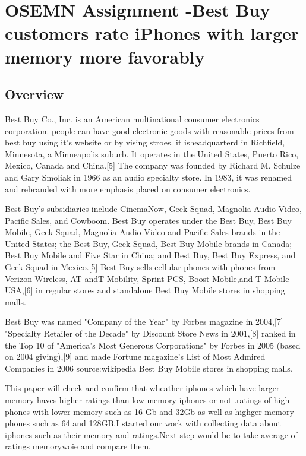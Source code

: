 \documentclass{article}\usepackage[]{graphicx}\usepackage[]{color}
\begin{document}
    \section*{OSEMN Assignment -Best Buy customers rate iPhones with larger memory more favorably}
\subsection*{Overview}
    
   \par Best Buy Co., Inc. is an American multinational consumer electronics corporation.
people can have good electronic goods with reasonable prices from best buy using it's website
or by vising stroes. it isheadquarterd in Richfield, Minnesota, a Minneapolis suburb. It operates in the United States, Puerto Rico, Mexico, Canada and China.[5] The company was founded by Richard M. Schulze and Gary Smoliak in 1966 as an audio specialty store. In 1983, it was renamed and rebranded with more emphasis placed on consumer electronics.
\smallskip
\par Best Buy's subsidiaries include CinemaNow, Geek Squad, Magnolia Audio Video, Pacific Sales, and Cowboom. Best Buy operates under the Best Buy, Best Buy Mobile, Geek Squad, Magnolia Audio Video and Pacific Sales brands in the United States; the Best Buy, Geek Squad, Best Buy Mobile brands in Canada; Best Buy Mobile and Five Star in China; and Best Buy, Best Buy Express, and Geek Squad in Mexico.[5] Best Buy sells cellular phones with phones from Verizon Wireless, AT andT Mobility, Sprint PCS, Boost Mobile,and T-Mobile USA,[6] in regular stores and standalone Best Buy Mobile stores in shopping malls.
\smallskip
\par Best Buy was named "Company of the Year" by Forbes magazine in 2004,[7] "Specialty Retailer of the Decade" by Discount Store News in 2001,[8] ranked in the Top 10 of "America's Most Generous Corporations" by Forbes in 2005 (based on 2004 giving),[9] and made Fortune magazine's List of Most Admired Companies in 2006
source:wikipedia
Best Buy Mobile stores in shopping malls.
\smallskip
\par This paper will check and confirm that wheather  iphones which have larger memory haves higher ratings than low memory iphones or not .ratings  of high phones with lower memory such as 16 Gb and 32Gb as well as highger memory phones such as 64 and 128GB.I started our work with collecting data about iphones such as their memory and ratings.Next step would be to take average of ratings memorywoie and compare them.
\smallskip
\end{document}
